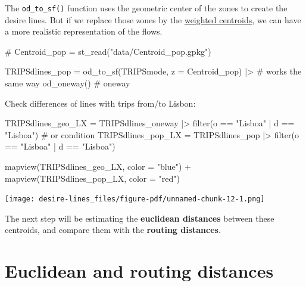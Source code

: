 \documentclass[
  letterpaper,
  DIV=11,
  numbers=noendperiod]{scrreprt}
\newenvironment{Shaded}{\begin{snugshade}}{\end{snugshade}}
\newcommand{\AttributeTok}[1]{\textcolor[rgb]{0.40,0.45,0.13}{#1}}
\newcommand{\CommentTok}[1]{\textcolor[rgb]{0.37,0.37,0.37}{#1}}
\newcommand{\FunctionTok}[1]{\textcolor[rgb]{0.28,0.35,0.67}{#1}}
\newcommand{\NormalTok}[1]{\textcolor[rgb]{0.00,0.23,0.31}{#1}}
\newcommand{\OtherTok}[1]{\textcolor[rgb]{0.00,0.23,0.31}{#1}}
\newcommand{\SpecialCharTok}[1]{\textcolor[rgb]{0.37,0.37,0.37}{#1}}
\newcommand{\StringTok}[1]{\textcolor[rgb]{0.13,0.47,0.30}{#1}}
\begin{document}
The \texttt{od\_to\_sf()} function uses the geometric center of the
zones to create the desire lines. But if we replace those zones by the
\hyperref[weighted-centroids]{weighted centroids}, we can have a more
realistic representation of the flows.

\begin{Shaded}
\begin{Highlighting}[]
\CommentTok{\# Centroid\_pop = st\_read("data/Centroid\_pop.gpkg")}

\NormalTok{TRIPSdlines\_pop }\OtherTok{=} \FunctionTok{od\_to\_sf}\NormalTok{(TRIPSmode, }\AttributeTok{z =}\NormalTok{ Centroid\_pop) }\SpecialCharTok{|\textgreater{}}  \CommentTok{\# works the same way}
  \FunctionTok{od\_oneway}\NormalTok{() }\CommentTok{\# oneway}
\end{Highlighting}
\end{Shaded}

Check differences of lines with trips from/to Lisbon:

\begin{Shaded}
\begin{Highlighting}[]
\NormalTok{TRIPSdlines\_geo\_LX }\OtherTok{=}\NormalTok{ TRIPSdlines\_oneway }\SpecialCharTok{|\textgreater{}} 
  \FunctionTok{filter}\NormalTok{(o }\SpecialCharTok{==} \StringTok{"Lisboa"} \SpecialCharTok{|}\NormalTok{ d }\SpecialCharTok{==} \StringTok{"Lisboa"}\NormalTok{) }\CommentTok{\# or condition}
\NormalTok{TRIPSdlines\_pop\_LX }\OtherTok{=}\NormalTok{ TRIPSdlines\_pop }\SpecialCharTok{|\textgreater{}} 
  \FunctionTok{filter}\NormalTok{(o }\SpecialCharTok{==} \StringTok{"Lisboa"} \SpecialCharTok{|}\NormalTok{ d }\SpecialCharTok{==} \StringTok{"Lisboa"}\NormalTok{)}

\FunctionTok{mapview}\NormalTok{(TRIPSdlines\_geo\_LX, }\AttributeTok{color =} \StringTok{"blue"}\NormalTok{) }\SpecialCharTok{+} \FunctionTok{mapview}\NormalTok{(TRIPSdlines\_pop\_LX, }\AttributeTok{color =} \StringTok{"red"}\NormalTok{)}
\end{Highlighting}
\end{Shaded}

\texttt{[image: desire-lines\_files/figure-pdf/unnamed-chunk-12-1.png]}

The next step will be estimating the \textbf{euclidean distances}
between these centroids, and compare them with the \textbf{routing
distances}.

\chapter{Euclidean and routing
distances}\label{euclidean-and-routing-distances}
\end{document}
